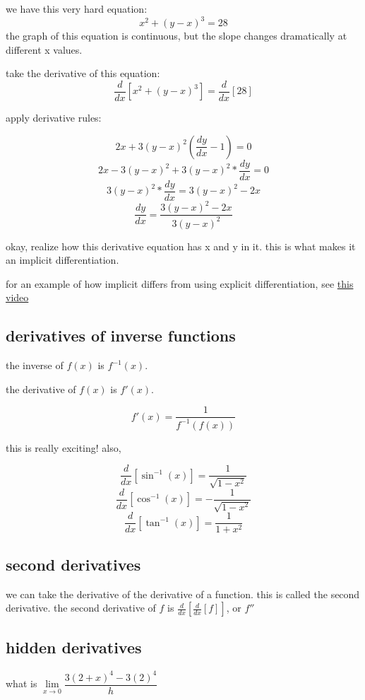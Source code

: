 \documentclass[11pt,a4paper]{article}
\begin{document}
we have this very hard equation:
$$x^2+(y-x)^3=28$$
the graph of this equation is continuous, but the slope changes dramatically at different x values.

take the derivative of this equation:
$$\dfrac{d}{dx}\left[x^2+(y-x)^3\right] = \dfrac{d}{dx}\left[28\right]$$

apply derivative rules:

$$2x+3(y-x)^2(\frac{dy}{dx}-1)=0$$
$$2x-3(y-x)^2+3(y-x)^2*\frac{dy}{dx}=0$$
$$3(y-x)^2*\frac{dy}{dx}=3(y-x)^2-2x$$
$$\frac{dy}{dx} = \frac{3(y-x)^2-2x}{3(y-x)^2}$$

okay, realize how this derivative equation has x and y in it. this is what makes it an implicit differentiation.

for an example of how implicit differs from using explicit differentiation, see \href{https://www.khanacademy.org/math/ap-calculus-ab/ab-differentiation-2-new/ab-3-2/v/showing-explicit-and-implicit-differentiation-give-same-result}{this video}

\subsection{derivatives of inverse functions}

the inverse of $f(x)$ is $f^{-1}(x)$.

the derivative of $f(x)$ is $f'(x)$.

$$f'(x) = \frac{1}{f^{-1}(f(x))}$$

this is really exciting! also,

$$\dfrac{d}{dx}\left[\sin^{-1}(x)\right] = \frac{1}{\sqrt{1-x^2}}$$
$$\dfrac{d}{dx}\left[\cos^{-1}(x)\right] = -\frac{1}{\sqrt{1-x^2}}$$
$$\dfrac{d}{dx}\left[\tan^{-1}(x)\right] = \frac{1}{1+x^2}$$

\subsection{second derivatives}

we can take the derivative of the derivative of a function. this is called the second derivative. the second derivative of $f$ is $\frac{d}{dx}\left[\frac{d}{dx}\left[f\right]\right]$, or $f''$

\subsection{hidden derivatives}

what is $\lim \limits_{x \to 0}\dfrac{3(2+x)^4-3(2)^4}{h}$
\end{document}
